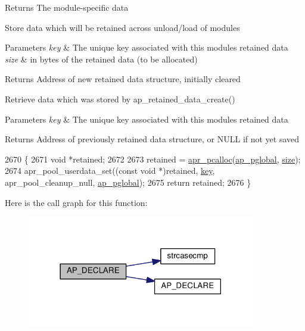 \begin{DoxyReturn}{Returns}
The module-\/specific data
\end{DoxyReturn}
Store data which will be retained across unload/load of modules 
\begin{DoxyParams}{Parameters}
{\em key} & The unique key associated with this module\textquotesingle{}s retained data \\
\hline
{\em size} & in bytes of the retained data (to be allocated) \\
\hline
\end{DoxyParams}
\begin{DoxyReturn}{Returns}
Address of new retained data structure, initially cleared
\end{DoxyReturn}
Retrieve data which was stored by ap\+\_\+retained\+\_\+data\+\_\+create() 
\begin{DoxyParams}{Parameters}
{\em key} & The unique key associated with this module\textquotesingle{}s retained data \\
\hline
\end{DoxyParams}
\begin{DoxyReturn}{Returns}
Address of previously retained data structure, or N\+U\+LL if not yet saved 
\end{DoxyReturn}

\begin{DoxyCode}
2670 \{
2671     \textcolor{keywordtype}{void} *retained;
2672 
2673     retained = \hyperlink{group__apr__pools_gad214fc0160de3c22b6435e29ea20fce8}{apr\_pcalloc}(\hyperlink{group__APACHE__CORE__MAIN_gae8d16ca8eacac353b47d8d908c630d94}{ap\_pglobal}, \hyperlink{group__APACHE__CORE__CONFIG_ga2bd3edb50f631a96f1b729fde236ff43}{size});
2674     apr\_pool\_userdata\_set((\textcolor{keyword}{const} \textcolor{keywordtype}{void} *)retained, \hyperlink{group__MOD__CACHE_ga11d8023381192746eb96be162398fe1c}{key}, apr\_pool\_cleanup\_null, 
      \hyperlink{group__APACHE__CORE__MAIN_gae8d16ca8eacac353b47d8d908c630d94}{ap\_pglobal});
2675     \textcolor{keywordflow}{return} retained;
2676 \}
\end{DoxyCode}


Here is the call graph for this function\+:
\nopagebreak
\begin{figure}[H]
\begin{center}
\leavevmode
\includegraphics[width=282pt]{group__APACHE__CORE__HTTPD_gab1fe9b59405e33a6d2b8e40e7fc5247d_cgraph}
\end{center}
\end{figure}


